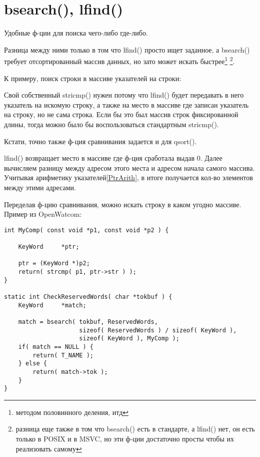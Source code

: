 ﻿\section{bsearch(), lfind()}
\label{bsearch_lfind}

Удобные ф-ции для поиска чего-либо где-либо. 

Разница между ними только в том что lfind() просто ищет заданное, а bsearch() требует отсортированный массив
данных, но зато может искать быстрее\footnote{методом половинного деления, итд}
\footnote{разница еще также в том что bsearch() есть в стандарте\cite{C99TC3}, 
а lfind() нет, он есть только в POSIX и в MSVC, но эти ф-ции достаточно просты чтобы их реализовать самому}.

К примеру, поиск строки в массиве указателей на строки:



Свой собственный stricmp() нужен потому что lfind() будет передавать в него указатель на искомую строку,
а также на место в массиве где записан указатель на строку, но не сама строка. Если бы это был
массив строк фиксированной длины, тогда можно было бы воспользоваться стандартным stricmp().

Кстати, точно также ф-ция сравнивания задается и для qsort().

lfind() возвращает место в массиве где ф-ция  сработала выдав 0. Далее вычисляем разницу
между адресом этого места и адресом начала самого массива. Учитывая арифметику указателей\ref{PtrArith}, 
в итоге получается кол-во элементов между этими адресами.

Переделав ф-цию сравнивания, можно искать строку в каком угодно массиве.
Пример из OpenWatcom:

\begin{lstlisting}[caption=\textbackslash{}bld\textbackslash{}pbide\textbackslash{}defgen\textbackslash{}scan.c]
int MyComp( const void *p1, const void *p2 ) {

    KeyWord     *ptr;

    ptr = (KeyWord *)p2;
    return( strcmp( p1, ptr->str ) );
}

static int CheckReservedWords( char *tokbuf ) {
    KeyWord     *match;

    match = bsearch( tokbuf, ReservedWords,
                     sizeof( ReservedWords ) / sizeof( KeyWord ),
                     sizeof( KeyWord ), MyComp );
    if( match == NULL ) {
        return( T_NAME );
    } else {
        return( match->tok );
    }
}
\end{lstlisting}

